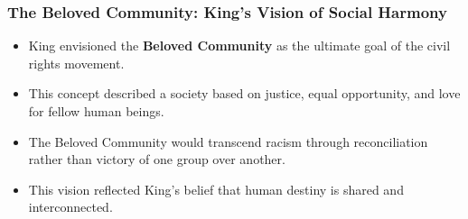 \documentclass{beamer}
\begin{document}
	\begin{frame}
		\frametitle{The Beloved Community: King's Vision of Social Harmony}
		
		\begin{itemize}
			\item King envisioned the \textbf{Beloved Community} as the ultimate goal of the civil rights movement.
			\item This concept described a society based on justice, equal opportunity, and love for fellow human beings.
			\item The Beloved Community would transcend racism through reconciliation rather than victory of one group over another.
			\item This vision reflected King's belief that human destiny is shared and interconnected.
		\end{itemize}
		
		\begin{center}
		\end{center}
		
	\end{frame}
	
\end{document}
